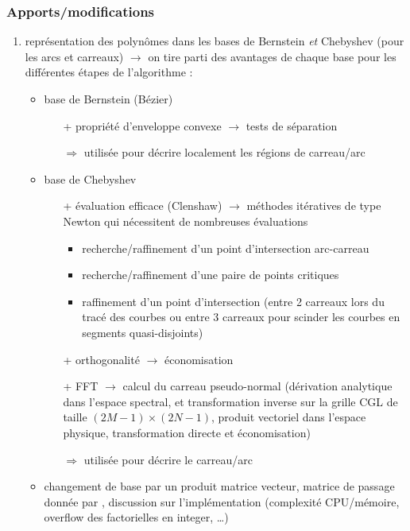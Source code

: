 \subsubsection{Apports/modifications}
\begin{enumerate}
	\item représentation des polynômes dans les bases de Bernstein \textit{et} Chebyshev (pour les arcs et carreaux) $\to$ on tire parti des avantages de chaque base pour les différentes étapes de l'algorithme :
	\begin{itemize}
		\item base de Bernstein (Bézier) 
		\begin{itemize}
			\item[+] propriété d'enveloppe convexe $\to$ tests de séparation
			\item[$\Rightarrow$] utilisée pour décrire localement les régions de carreau/arc
		\end{itemize}
		\item base de Chebyshev
		\begin{itemize}
			\item[+] évaluation efficace (Clenshaw) $\to$ méthodes itératives de type Newton qui nécessitent de nombreuses évaluations
			\begin{itemize}
				\item recherche/raffinement d'un point d'intersection arc-carreau
				\item recherche/raffinement d'une paire de points critiques
				\item raffinement d'un point d'intersection (entre 2 carreaux lors du tracé des courbes ou entre 3 carreaux pour scinder les courbes en segments quasi-disjoints)
			\end{itemize}
			\item[+] orthogonalité $\to$ économisation
			\item[+] FFT $\to$ calcul du carreau pseudo-normal (dérivation analytique dans l'espace spectral,  et transformation inverse sur la grille CGL de taille $(2M - 1) \times (2N - 1)$, produit vectoriel dans l'espace physique, transformation directe et économisation)
			\item[$\Rightarrow$] utilisée pour décrire le carreau/arc 
		\end{itemize}
		\item changement de base par un produit matrice vecteur, matrice de passage donnée par \cite{rababah2003}, discussion sur l'implémentation (complexité CPU/mémoire, overflow des factorielles en integer, \ldots)

\end{itemize}
\end{enumerate}
